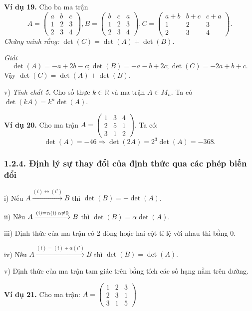 \textbf{Ví dụ 19.} Cho ba ma trận
\[
A = \begin{pmatrix}
a & b & c \\
1 & 2 & 3 \\
2 & 3 & 4
\end{pmatrix},
B = \begin{pmatrix}
b & c & a \\
1 & 2 & 3 \\
2 & 3 & 4
\end{pmatrix},
C = \begin{pmatrix}
a + b & b + c & c + a \\
1 & 2 & 3 \\
2 & 3 & 4
\end{pmatrix}.
\]
\textit{Chứng minh rằng:} \(\det(C) = \det(A) + \det(B)\).

\textit{Giải}
\[
\det(A) = -a + 2b - c; \det(B) = -a - b + 2c; \det(C) = -2a + b + c.
\]
Vậy \(\det(C) = \det(A) + \det(B)\).

v) \textit{Tính chất 5.} Cho số thực \(k \in \mathbb{R}\) và ma trận \(A \in M_n\). Ta có \(\det(kA) = k^n \det(A)\).

\textbf{Ví dụ 20.} Cho ma trận \(A = \begin{pmatrix}
1 & 3 & 4 \\
2 & 5 & 1 \\
3 & 1 & 2
\end{pmatrix} \).
Ta có:
\[
\det(A) = -46 \Rightarrow \det(2A) = 2^3 \det(A) = -368.
\]

\subsubsection*{1.2.4. Định lý sự thay đổi của định thức qua các phép biến đổi}

i) Nếu \(A \xrightarrow{(i) \leftrightarrow (i')} B\) thì \(\det(B) = -\det(A)\).

ii) Nếu \(A \xrightarrow{(i)=\alpha(i) \\ \alpha \neq 0} B\) thì \(\det(B) = \alpha \det(A)\).

iii) Định thức của ma trận có 2 dòng hoặc hai cột tỉ lệ với nhau thì bằng 0.

iv) Nếu \(A \xrightarrow{(i)=(i)+\alpha(i')} B\) thì \(\det(B) = \det(A)\).

v) Định thức của ma trận tam giác trên bằng tích các số hạng nằm trên đường.

\textbf{Ví dụ 21.} Cho ma trận: \(A = \begin{pmatrix}
1 & 2 & 3 \\
2 & 3 & 1 \\
3 & 1 & 5
\end{pmatrix} \)

